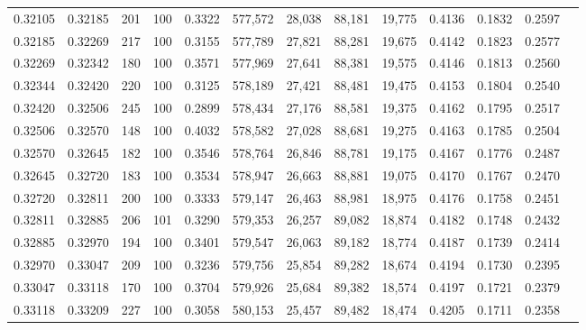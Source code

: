 \begin{tabular}{rrrrrrrrrrrrr}
0.32105 & 0.32185 &   201 & 100 &                                     0.3322 & 577,572 &  28,038 &  88,181 &  19,775 & 0.4136 & 0.1832 & 0.2597 \\
0.32185 & 0.32269 &   217 & 100 &                                     0.3155 & 577,789 &  27,821 &  88,281 &  19,675 & 0.4142 & 0.1823 & 0.2577 \\
0.32269 & 0.32342 &   180 & 100 &                                     0.3571 & 577,969 &  27,641 &  88,381 &  19,575 & 0.4146 & 0.1813 & 0.2560 \\
0.32344 & 0.32420 &   220 & 100 &                                     0.3125 & 578,189 &  27,421 &  88,481 &  19,475 & 0.4153 & 0.1804 & 0.2540 \\
0.32420 & 0.32506 &   245 & 100 &                                     0.2899 & 578,434 &  27,176 &  88,581 &  19,375 & 0.4162 & 0.1795 & 0.2517 \\
0.32506 & 0.32570 &   148 & 100 &                                     0.4032 & 578,582 &  27,028 &  88,681 &  19,275 & 0.4163 & 0.1785 & 0.2504 \\
0.32570 & 0.32645 &   182 & 100 &                                     0.3546 & 578,764 &  26,846 &  88,781 &  19,175 & 0.4167 & 0.1776 & 0.2487 \\
0.32645 & 0.32720 &   183 & 100 &                                     0.3534 & 578,947 &  26,663 &  88,881 &  19,075 & 0.4170 & 0.1767 & 0.2470 \\
0.32720 & 0.32811 &   200 & 100 &                                     0.3333 & 579,147 &  26,463 &  88,981 &  18,975 & 0.4176 & 0.1758 & 0.2451 \\
0.32811 & 0.32885 &   206 & 101 &                                     0.3290 & 579,353 &  26,257 &  89,082 &  18,874 & 0.4182 & 0.1748 & 0.2432 \\
0.32885 & 0.32970 &   194 & 100 &                                     0.3401 & 579,547 &  26,063 &  89,182 &  18,774 & 0.4187 & 0.1739 & 0.2414 \\
0.32970 & 0.33047 &   209 & 100 &                                     0.3236 & 579,756 &  25,854 &  89,282 &  18,674 & 0.4194 & 0.1730 & 0.2395 \\
0.33047 & 0.33118 &   170 & 100 &                                     0.3704 & 579,926 &  25,684 &  89,382 &  18,574 & 0.4197 & 0.1721 & 0.2379 \\
0.33118 & 0.33209 &   227 & 100 &                                     0.3058 & 580,153 &  25,457 &  89,482 &  18,474 & 0.4205 & 0.1711 & 0.2358 \\

\end{tabular}
